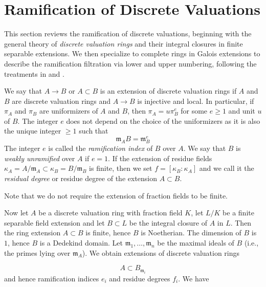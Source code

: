 \section{Ramification of Discrete Valuations}\label{section:ramification_of_discrete_valuations}
This section reviews the ramification of discrete valuations, beginning with the general theory of \textit{discrete valuation rings} and their
integral closures in finite separable extensions.
We then specialize to complete rings in Galois extensions to describe the ramification filtration via lower and upper numbering,
following the treatments in  and \cite{serreLF}.

\begin{definition}[\stackstag{09E4}]\label{definition:weakly_unramified_and_tamely_ramified_DVR}
    We say that $A \to B$ or $A \subset B$ is an extension of discrete valuation rings if $A$ and $B$ are discrete valuation rings and $A \to B$ is injective and local. In particular, if $\pi _ A$ and $\pi _ B$ are uniformizers of $A$ and $B$, then $\pi _ A = u \pi _ B^ e$ for some $e \geq 1$ and unit $u$ of $B$. The integer $e$ does not depend on the choice of the uniformizers as it is also the unique integer $\geq 1$ such that
\[ \mathfrak m_ A B = \mathfrak m_ B^ e \]
The integer $e$ is called the \textit{ramification index} of $B$ over $A$. We say that $B$ is \textit{weakly unramified} over $A$ if $e = 1$.
If the extension of residue fields $\kappa _ A = A/\mathfrak m_ A \subset \kappa _ B = B/\mathfrak m_ B$ is finite,
then we set $f = [\kappa _ B : \kappa _ A]$ and we call it the \textit{residual degree} or residue degree of the extension $A \subset B$.

Note that we do not require the extension of fraction fields to be finite.
\end{definition}

Now let $A$ be a discrete valuation ring with fraction field $K$, let  $L/K$ be a finite separable field extension and
let $B \subset L$ be the integral closure of $A$ in $L$.
Then the ring extension $A \subset B$ is finite, hence $B$ is Noetherian.
The dimension of $B$ is $1$, hence $B$ is a Dedekind domain.
Let $\mathfrak m_1, \ldots , \mathfrak m_ n$ be the maximal ideals of $B$ (i.e., the primes lying over $\mathfrak m_ A$).
We obtain extensions of discrete valuation rings

\[ A \subset B_{\mathfrak m_ i} \]
and hence ramification indices $e_ i$ and residue degrees $f_ i$. We have

